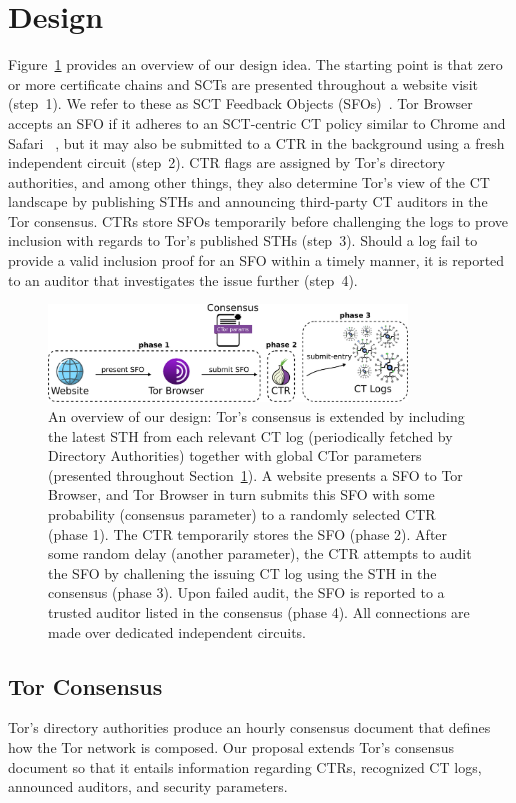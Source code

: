 \section{Design} \label{sec:design}
Figure~\ref{fig:overview} provides an overview of our design idea.  The starting
point is that zero or more certificate chains and SCTs are presented
throughout a website visit (step~1).  We refer to these as SCT Feedback Objects
(SFOs)~\cite{nordberg}.  Tor Browser accepts an SFO if it adheres to an
SCT-centric CT policy similar to Chrome and Safari~%
\cite{chrome-policy,safari-policy}, but it may also be submitted to a CTR
in the background using a fresh independent circuit (step~2).  CTR flags are
assigned by Tor's directory authorities, and among other things, they also
determine Tor's view of the CT landscape by publishing STHs and announcing
third-party CT auditors in the Tor consensus.  CTRs store SFOs temporarily
before challenging the logs to prove inclusion with regards to Tor's published
STHs (step~3).  Should a log fail to provide a valid inclusion proof for an SFO
within a timely manner, it is reported to an auditor that investigates the issue
further (step~4).
\begin{figure}
	\centering
	\includegraphics[width=0.85\textwidth]{img/setting-ca}
	\caption{An overview of our design: Tor's consensus is extended by including
		the latest STH from each relevant CT log (periodically fetched by
		Directory Authorities) together with global CTor parameters (presented
		throughout Section~\ref{sec:design}). A website presents a SFO to Tor
		Browser, and Tor Browser in turn submits this SFO with some probability
		(consensus parameter) to a randomly selected CTR (phase 1). The CTR
		temporarily stores the SFO (phase 2). After some random delay (another
		parameter), the CTR attempts to audit the SFO by challening the issuing
		CT log using the STH in the consensus (phase 3). Upon failed audit, the
		SFO is reported to a trusted auditor listed in the consensus (phase 4).
		All connections are made over dedicated independent circuits.}
	\label{fig:overview}
\end{figure}

\subsection{Tor Consensus}
Tor's directory authorities produce an hourly consensus document that defines
how the Tor network is composed.  Our proposal extends Tor's consensus document
so that it entails information regarding
	CTRs,
	recognized CT logs,
	announced auditors, and
	security parameters.

